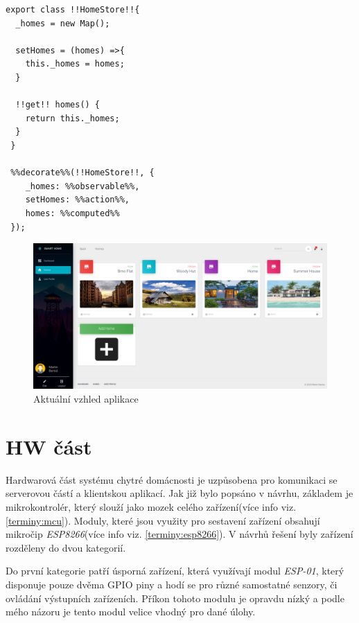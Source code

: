 \begin{lstlisting}[style=JavaScriptStyle,caption={Ukázka vytvoření \emph{store} pro domácnost}]
 export class !!HomeStore!!{
  _homes = new Map();

  setHomes = (homes) =>{
    this._homes = homes;
  }

  !!get!! homes() {
    return this._homes;
  }
 }

 %%decorate%%(!!HomeStore!!, {
    _homes: %%observable%%,
    setHomes: %%action%%,
    homes: %%computed%%
 });
\end{lstlisting}

\begin{figure}[hbt]
  \centering
  \includegraphics[width=1 \linewidth]{obrazky-figures/actualView.png}
  \caption{Aktuální vzhled aplikace}
  \label{figure:actual_app}
\end{figure}

\newpage
\section{HW část}
\label{impl:hw}
Hardwarová část systému chytré domácnosti je uzpůsobena pro komunikaci se serverovou částí a klientskou aplikací.
Jak již bylo popsáno v návrhu, základem je mikrokontrolér, který slouží jako mozek celého zařízení(více info viz. \ref{terminy:mcu}).
Moduly, které jsou využity pro sestavení zařízení obsahují mikročip \emph{ESP8266}(více info viz. \ref{terminy:esp8266}).
V návrhů řešení byly zařízení rozděleny do dvou kategorií.

Do první kategorie patří úsporná zařízení, která využívají modul \emph{ESP-01}, který disponuje pouze dvěma GPIO piny a hodí se pro různé samostatné senzory, či ovládání výstupních zařízeních.
Příkon tohoto modulu je opravdu nízký a podle mého názoru je tento modul velice vhodný pro dané úlohy.

